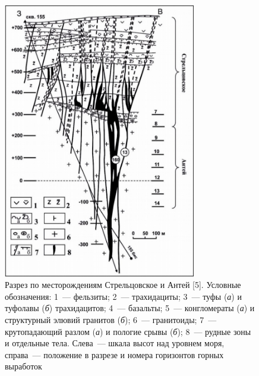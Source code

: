 \begin{figure}[H]
  \begin{center}
    \includegraphics[width=0.75\textwidth]{authors/mandzhieva-fig-2.png}
  \end{center}
  \caption{Разрез по месторождениям Стрельцовское и Антей [5].
Условные обозначения: 1~--- фельзиты; 2~--- трахидациты; 3~--- туфы (\textit{а}) и туфолавы (\textit{б}) трахидацитов; 4~--- базальты; 5~--- конгломераты (\textit{а}) и структурный элювий гранитов (\textit{б}); 6~--- гранитоиды; 7~--- крутопадающий разлом (\textit{а}) и пологие срывы (\textit{б}); 8~--- рудные зоны и отдельные тела. Слева~--- шкала высот над уровнем моря, справа~--- положение в разрезе и номера горизонтов горных выработок}
  \label{fig:mandzhieva-fig2}
\end{figure}

